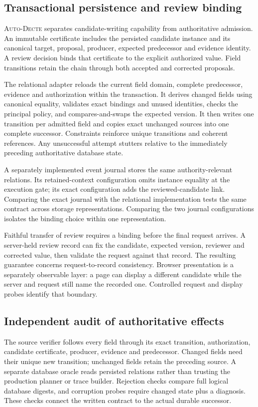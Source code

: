 \documentclass[10pt,a4paper,twocolumn]{article}
\newcommand{\system}{\textsc{Auto-Decte}}
\begin{document}
\subsection{Transactional persistence and review binding}
\system{} separates candidate-writing capability from authoritative admission. An immutable certificate includes the persisted candidate instance and its canonical target, proposal, producer, expected predecessor and evidence identity. A review decision binds that certificate to the explicit authorized value. Field transitions retain the chain through both accepted and corrected proposals.

The relational adapter reloads the current field domain, complete predecessor, evidence and authorization within the transaction. It derives changed fields using canonical equality, validates exact bindings and unused identities, checks the principal policy, and compares-and-swaps the expected version. It then writes one transition per admitted field and copies exact unchanged sources into one complete successor. Constraints reinforce unique transitions and coherent references. Any unsuccessful attempt stutters relative to the immediately preceding authoritative database state.

A separately implemented event journal stores the same authority-relevant relations. Its retained-context configuration omits instance equality at the execution gate; its exact configuration adds the reviewed-candidate link. Comparing the exact journal with the relational implementation tests the same contract across storage representations. Comparing the two journal configurations isolates the binding choice within one representation.

Faithful transfer of review requires a binding before the final request arrives. A server-held review record can fix the candidate, expected version, reviewer and corrected value, then validate the request against that record. The resulting guarantee concerns request-to-record consistency. Browser presentation is a separately observable layer: a page can display a different candidate while the server and request still name the recorded one. Controlled request and display probes identify that boundary.

\subsection{Independent audit of authoritative effects}
The source verifier follows every field through its exact transition, authorization, candidate certificate, producer, evidence and predecessor. Changed fields need their unique new transition; unchanged fields retain the preceding source. A separate database oracle reads persisted relations rather than trusting the production planner or trace builder. Rejection checks compare full logical database digests, and corruption probes require changed state plus a diagnosis. These checks connect the written contract to the actual durable successor.
\end{document}
